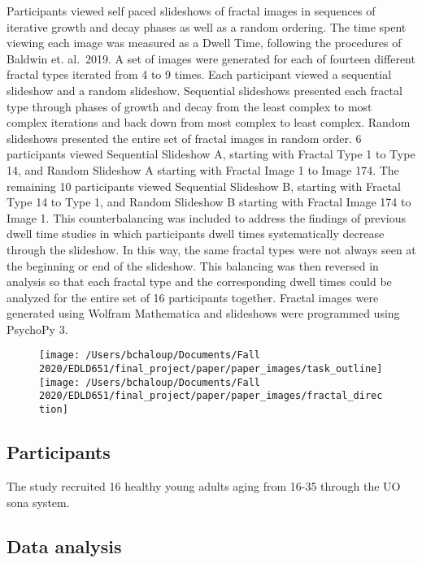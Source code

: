 \documentclass[english,jou]{apa6}
\begin{document}
Participants viewed self paced slideshows of fractal images in sequences of iterative growth and decay phases as well as a random ordering. The time spent viewing each image was measured as a Dwell Time, following the procedures of Baldwin et. al.~2019. A set of images were generated for each of fourteen different fractal types iterated from 4 to 9 times. Each participant viewed a sequential slideshow and a random slideshow. Sequential slideshows presented each fractal type through phases of growth and decay from the least complex to most complex iterations and back down from most complex to least complex. Random slideshows presented the entire set of fractal images in random order. 6 participants viewed Sequential Slideshow A, starting with Fractal Type 1 to Type 14, and Random Slideshow A starting with Fractal Image 1 to Image 174. The remaining 10 participants viewed Sequential Slideshow B, starting with Fractal Type 14 to Type 1, and Random Slideshow B starting with Fractal Image 174 to Image 1. This counterbalancing was included to address the findings of previous dwell time studies in which participants dwell times systematically decrease through the slideshow. In this way, the same fractal types were not always seen at the beginning or end of the slideshow. This balancing was then reversed in analysis so that each fractal type and the corresponding dwell times could be analyzed for the entire set of 16 participants together. Fractal images were generated using Wolfram Mathematica and slideshows were programmed using PsychoPy 3.

\begin{figure}

\texttt{[image: /Users/bchaloup/Documents/Fall 2020/EDLD651/final\_project/paper/paper\_images/task\_outline]} \texttt{[image: /Users/bchaloup/Documents/Fall 2020/EDLD651/final\_project/paper/paper\_images/fractal\_direction]} \hfill{}

\caption{ }\label{fig:unnamed-chunk-6}
\end{figure}

\hypertarget{participants}{%
\subsection{Participants}\label{participants}}

The study recruited 16 healthy young adults aging from 16-35 through the UO sona system.

\hypertarget{data-analysis}{%
\subsection{Data analysis}\label{data-analysis}}
\end{document}
